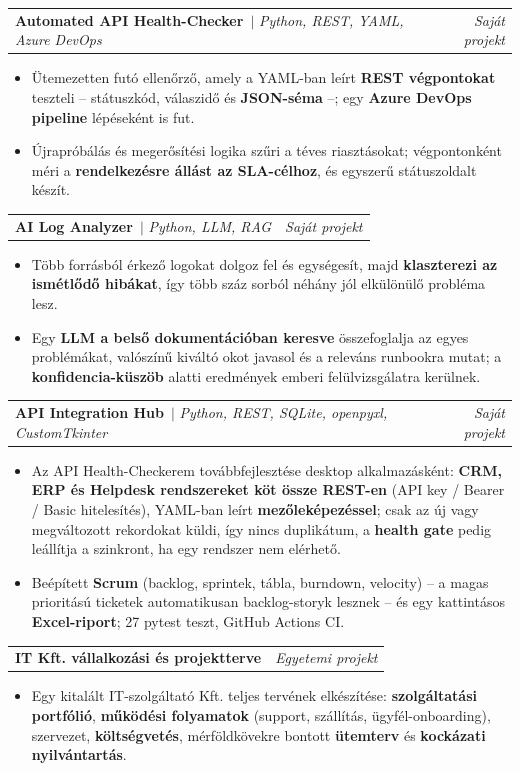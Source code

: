\documentclass[a4paper,11pt]{article}
\makeatletter
\newcommand{\resumeItem}[1]{\item\small{#1\vspace{-2pt}}}
\newcommand{\resumeProjectHeading}[2]{
  \item
    \begin{tabular*}{0.97\textwidth}{l@{\extracolsep{\fill}}r}
      \small #1 & \textit{\small\color{muted} #2} \\
    \end{tabular*}\vspace{-7pt}
}
\newcommand{\ghuser}{juanmiguelaasg}
\newcommand{\ghlink}[1]{\,\href{https://github.com/\ghuser/#1}{\faGithub}}
\newcommand{\resumeItemListStart}{\begin{itemize}[itemsep=1pt]}
\newcommand{\resumeItemListEnd}{\end{itemize}\vspace{-5pt}}
\makeatother
\begin{document}
    \resumeProjectHeading
      {\textbf{Automated API Health-Checker}\ghlink{api-health-checker} $|$ \emph{Python, REST, YAML, Azure DevOps}}{Saját projekt}
      \resumeItemListStart
        \resumeItem{Ütemezetten futó ellenőrző, amely a YAML-ban leírt \textbf{REST végpontokat} teszteli -- státuszkód, válaszidő
          és \textbf{JSON-séma} --; egy \textbf{Azure DevOps pipeline} lépéseként is fut.}
        \resumeItem{Újrapróbálás és megerősítési logika szűri a téves riasztásokat; végpontonként méri a \textbf{rendelkezésre
          állást az SLA-célhoz}, és egyszerű státuszoldalt készít.}
      \resumeItemListEnd

    \resumeProjectHeading
      {\textbf{AI Log Analyzer}\ghlink{ai-log-analyzer} $|$ \emph{Python, LLM, RAG}}{Saját projekt}
      \resumeItemListStart
        \resumeItem{Több forrásból érkező logokat dolgoz fel és egységesít, majd \textbf{klaszterezi az ismétlődő hibákat}, így
          több száz sorból néhány jól elkülönülő probléma lesz.}
        \resumeItem{Egy \textbf{LLM a belső dokumentációban keresve} összefoglalja az egyes problémákat, valószínű kiváltó okot
          javasol és a releváns runbookra mutat; a \textbf{konfidencia-küszöb} alatti eredmények emberi felülvizsgálatra kerülnek.}
      \resumeItemListEnd

    \resumeProjectHeading
      {\textbf{API Integration Hub}\ghlink{api-integration-hub} $|$ \emph{Python, REST, SQLite, openpyxl, CustomTkinter}}{Saját projekt}
      \resumeItemListStart
        \resumeItem{Az API Health-Checkerem továbbfejlesztése desktop alkalmazásként: \textbf{CRM, ERP és Helpdesk rendszereket
          köt össze REST-en} (API key / Bearer / Basic hitelesítés), YAML-ban leírt \textbf{mezőleképezéssel}; csak az új vagy
          megváltozott rekordokat küldi, így nincs duplikátum, a \textbf{health gate} pedig leállítja a szinkront, ha egy
          rendszer nem elérhető.}
        \resumeItem{Beépített \textbf{Scrum} (backlog, sprintek, tábla, burndown, velocity) -- a magas prioritású ticketek
          automatikusan backlog-storyk lesznek -- és egy kattintásos \textbf{Excel-riport}; 27 pytest teszt, GitHub Actions CI.}
      \resumeItemListEnd

    \resumeProjectHeading
      {\textbf{IT Kft. vállalkozási és projektterve}}{Egyetemi projekt}
      \resumeItemListStart
        \resumeItem{Egy kitalált IT-szolgáltató Kft. teljes tervének elkészítése: \textbf{szolgáltatási portfólió},
          \textbf{működési folyamatok} (support, szállítás, ügyfél-onboarding), szervezet, \textbf{költségvetés},
          mérföldkövekre bontott \textbf{ütemterv} és \textbf{kockázati nyilvántartás}.}
      \resumeItemListEnd
\end{document}
